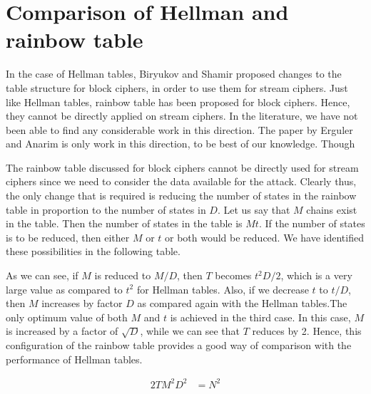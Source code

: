 \section{Comparison of Hellman and rainbow table}
\label{sec:compare-hellman-rainbow}

In the case of Hellman tables, Biryukov and Shamir proposed changes to the table structure for block ciphers, in order to use them for stream ciphers. Just like Hellman tables, rainbow table has been proposed for block ciphers. Hence, they cannot be directly applied on stream ciphers. In the literature, we have not been able to find any considerable work in this direction. The paper by Erguler and Anarim is only work in this direction, to be best of our knowledge. Though 

The rainbow table discussed for block ciphers cannot be directly used for stream ciphers since we need to consider the data available for the attack. Clearly thus, the only change that is required is reducing the number of states in the rainbow table in proportion to the number of states in $D$. Let us say that $M$ chains exist in the table. Then the number of states in the table is $Mt$. If the number of states is to be reduced, then either $M$ or $t$ or both would be reduced. We have identified these possibilities in the following table. 


As we can see, if $M$ is reduced to $M/D$, then $T$ becomes $t^2D/2$, which is a very large value as compared to $t^2$ for Hellman tables. Also, if we decrease $t$ to $t/D$, then $M$ increases by factor $D$ as compared again with the Hellman tables.The only optimum value of both $M$ and $t$ is achieved in the third case. In this case, $M$ is increased by a factor of $\sqrt{D}$, while we can see that $T$ reduces by 2. Hence, this configuration of the rainbow table provides a good way of comparison with the performance of Hellman tables. 


\begin{align}
\label{eq:tmdto-rainbow-stream} 2TM^2D^2 &= N^2
\end{align}